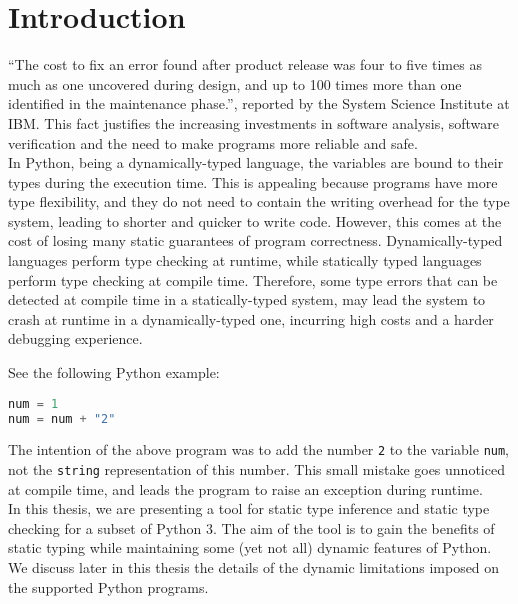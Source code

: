 
\chapter{Introduction}\label{chapter:introduction}

“The cost to fix an error found after product release was four to five times as much as one uncovered during design, and up to 100 times more than one identified in the maintenance phase.”, reported by the System Science Institute at IBM. This fact justifies the increasing investments in software analysis, software verification and the need to make programs more reliable and safe.\\

In Python, being a dynamically-typed language, the variables are bound to their types during the execution time. This is appealing because programs have more type flexibility, and they do not need to contain the writing overhead for the type system, leading to shorter and quicker to write code. However, this comes at the cost of losing many static guarantees of program correctness. Dynamically-typed languages perform type checking at runtime, while statically typed languages perform type checking at compile time. Therefore, some type errors that can be detected at compile time in a statically-typed system, may lead the system to crash at runtime in a dynamically-typed one, incurring high costs and a harder debugging experience.

See the following Python example:

\begin{lstlisting}[language=python]
num = 1
num = num + "2"
\end{lstlisting}



The intention of the above program was to add the number \lstinline|2| to the variable \lstinline|num|, not the \lstinline|string| representation of this number. This small mistake goes unnoticed at compile time, and leads the program to raise an exception during runtime.\\

In this thesis, we are presenting a tool for static type inference and static type checking for a subset of Python 3. The aim of the tool is to gain the benefits of static typing while maintaining some (yet not all) dynamic features of Python. We discuss later in this thesis the details of the dynamic limitations imposed on the supported Python programs.\\

